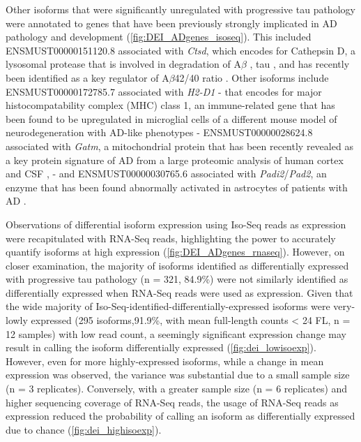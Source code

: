 Other isoforms that were significantly unregulated with progressive tau pathology were annotated to genes that have been previously strongly implicated in AD pathology and development (\cref{fig:DEI_ADgenes_isoseq}). This included ENSMUST00000151120.8 associated with \textit{Ctsd}, which encodes for Cathepsin D, a lysosomal protease that is involved in degradation of A$\beta$ \cite{JR1996}, tau \cite{A1997}, and has recently been identified as a key regulator of A$\beta$42/40 ratio \cite{Suire2020}. Other isoforms include ENSMUST00000172785.7 associated with \textit{H2-D1} - that encodes for major histocompatability complex (MHC) class 1, an immune-related gene that has been found to be upregulated in microglial cells of a different mouse model of neurodegeneration with AD-like phenotypes \cite{Mathys2017} - ENSMUST00000028624.8 associated with \textit{Gatm}, a mitochondrial protein that has been recently revealed as a key protein signature of AD from a large proteomic analysis of human cortex and CSF \cite{Wang2020}, - and ENSMUST00000030765.6 associated with \textit{Padi2}/\textit{Pad2}, an enzyme that has been found abnormally activated in astrocytes of patients with AD \cite{A2005}.

Observations of differential isoform expression using Iso-Seq reads as expression were recapitulated with RNA-Seq reads, highlighting the power to accurately quantify isoforms at high expression (\cref{fig:DEI_ADgenes_rnaseq}).
However, on closer examination, the majority of isoforms identified as differentially expressed with progressive tau pathology (n = 321, 84.9\%) were not similarly identified as differentially expressed when RNA-Seq reads were used as expression. Given that the wide majority of Iso-Seq-identified-differentially-expressed isoforms were very-lowly expressed (295 isoforms,91.9\%, with mean full-length counts < 24 FL, n = 12 samples) with low read count, a seemingly significant expression change may result in calling the isoform differentially expressed (\cref{fig:dei_lowisoexp}). However, even for more highly-expressed isoforms, while a change in mean expression was observed, the variance was substantial due to a small sample size (n = 3 replicates). Conversely, with a greater sample size (n = 6 replicates) and higher sequencing coverage of RNA-Seq reads, the usage of RNA-Seq reads as expression reduced the probability of calling an isoform as differentially expressed due to chance (\cref{fig:dei_highisoexp}).      

